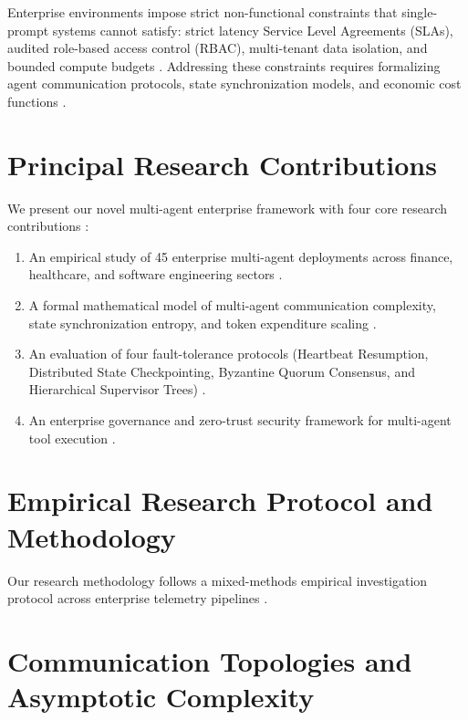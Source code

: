 \documentclass[10pt,twocolumn,letterpaper]{article}
\begin{document}
Enterprise environments impose strict non-functional constraints that single-prompt systems cannot satisfy: strict latency Service Level Agreements (SLAs), audited role-based access control (RBAC), multi-tenant data isolation, and bounded compute budgets \cite{crossref_10_1108_jeim_12_2025_1269,arxiv_2411_15594}. Addressing these constraints requires formalizing agent communication protocols, state synchronization models, and economic cost functions \cite{arxiv_2302_10809,arxiv_2203_08975}.


\section{Principal Research Contributions}


We present our novel multi-agent enterprise framework with four core research contributions \cite{crossref_10_1201_9788743808145_14}:
\begin{enumerate}
  \item An empirical study of 45 enterprise multi-agent deployments across finance, healthcare, and software engineering sectors \cite{crossref_10_1201_9788743808145_14}.
  \item A formal mathematical model of multi-agent communication complexity, state synchronization entropy, and token expenditure scaling \cite{arxiv_2404_01131}.
  \item An evaluation of four fault-tolerance protocols (Heartbeat Resumption, Distributed State Checkpointing, Byzantine Quorum Consensus, and Hierarchical Supervisor Trees) \cite{arxiv_2010_11146,arxiv_2412_06333}.
  \item An enterprise governance and zero-trust security framework for multi-agent tool execution \cite{arxiv_2404_04289,openalex_w4400578758}.
\end{enumerate}




\section{Empirical Research Protocol and Methodology}

Our research methodology follows a mixed-methods empirical investigation protocol across enterprise telemetry pipelines \cite{crossref_10_1201_9788743808145_14}.


\section{Communication Topologies and Asymptotic Complexity}
\end{document}
